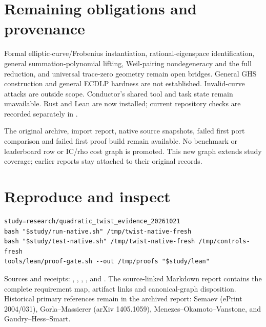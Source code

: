 \documentclass[10pt]{article}
\begin{document}
\section*{Remaining obligations and provenance}
Formal elliptic-curve/Frobenius instantiation, rational-eigenspace
identification, general summation-polynomial lifting, Weil-pairing
nondegeneracy and the full reduction, and universal trace-zero geometry remain
open bridges. General GHS construction and general ECDLP hardness are not
established. Invalid-curve attacks are outside scope. Conductor's shared tool
and task state remain unavailable. Rust and Lean are now installed; current
repository checks are recorded separately in .

The original archive, import report, native source snapshots, failed first
port comparison and failed first proof build remain available. No benchmark
or leaderboard row or IC/rho cost graph is promoted. This new graph extends
study coverage; earlier reports stay attached to their original records.

\section*{Reproduce and inspect}
\begin{verbatim}
study=research/quadratic_twist_evidence_20261021
bash "$study/run-native.sh" /tmp/twist-native-fresh
bash "$study/test-native.sh" /tmp/twist-native-fresh /tmp/controls-fresh
tools/lean/proof-gate.sh --out /tmp/proofs "$study/lean"
\end{verbatim}
Sources and receipts: ,
, ,
, and .
The source-linked Markdown report contains the complete requirement map,
artifact links and canonical-graph disposition. Historical primary references
remain in the archived report: Semaev (ePrint 2004/031), Gorla--Massierer
(arXiv 1405.1059), Menezes--Okamoto--Vanstone, and Gaudry--Hess--Smart.
\end{document}
